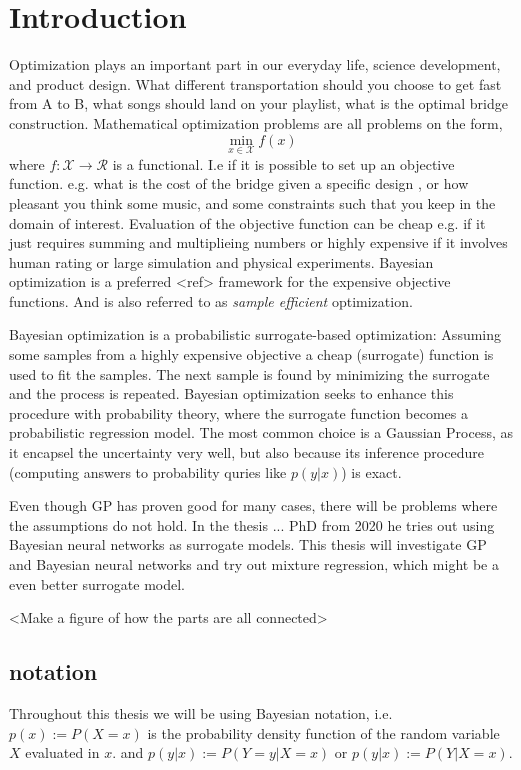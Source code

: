 \chapter{Introduction}

Optimization plays an important part in our everyday life, science development, and product design.
What different transportation should you choose to get fast from A to B, what songs should
land on your playlist, what is the optimal bridge construction. Mathematical optimization problems 
are all problems on the form, 
$$\min_{x\in \mathcal{X}} f(x)$$
where $f: \mathcal{X} \rightarrow \mathcal{R}$ is a functional. I.e if it is possible to set up
an objective function. e.g. what is the cost of the bridge given a specific design
, or how pleasant you think some music, and some constraints such that you keep in the domain of
interest. Evaluation of the objective function can be cheap e.g. if it just requires summing and 
multiplieing numbers or highly expensive if it involves human rating or large simulation and physical 
experiments. Bayesian optimization is a preferred <ref> framework for the expensive objective functions. 
And is also referred to as \textit{sample efficient} optimization. 

Bayesian optimization is a probabilistic surrogate-based optimization: Assuming some samples from a
highly expensive objective a cheap (surrogate) function is used to fit the samples. The next sample
is found by minimizing the surrogate and the process is repeated. Bayesian optimization seeks to
enhance this procedure with probability theory, where the surrogate function becomes a probabilistic
regression model. The most common choice is a Gaussian Process, as it encapsel the uncertainty very well,
but also because its inference procedure (computing answers to probability quries like $p(y|x)$) is exact.

Even though GP has proven good for many cases, there will be problems where the assumptions do not hold. 
In the thesis ... PhD from 2020 he tries out using Bayesian neural networks as surrogate models. 
This thesis will investigate GP and Bayesian neural networks and try out mixture regression, 
which might be a even better surrogate model. 

<Make a figure of how the parts are all connected>

\section{notation}
Throughout this thesis we will be using Bayesian notation, i.e. $p(x) := P(X=x)$ is 
the probability density function of the random variable $X$ evaluated in $x$. 
and $p(y|x) := P(Y=y|X=x)$ or $p(y|x) := P(Y|X=x)$.